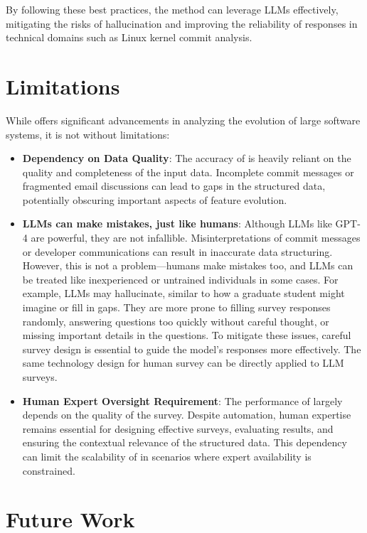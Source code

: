 By following these best practices, the \sys method can leverage LLMs effectively, mitigating the risks of hallucination and improving the reliability of responses in technical domains such as Linux kernel commit analysis.


\section{Limitations}

While \emph{\sys} offers significant advancements in analyzing the evolution of large software systems, it is not without limitations:

\begin{itemize}
    \item \textbf{Dependency on Data Quality}: The accuracy of \emph{\sys} is heavily reliant on the quality and completeness of the input data. Incomplete commit messages or fragmented email discussions can lead to gaps in the structured data, potentially obscuring important aspects of feature evolution.

    \item \textbf{LLMs can make mistakes, just like humans}: Although LLMs like GPT-4 are powerful, they are not infallible. Misinterpretations of commit messages or developer communications can result in inaccurate data structuring. However, this is not a problem—humans make mistakes too, and LLMs can be treated like inexperienced or untrained individuals in some cases. For example, LLMs may hallucinate, similar to how a graduate student might imagine or fill in gaps. They are more prone to filling survey responses randomly, answering questions too quickly without careful thought, or missing important details in the questions. To mitigate these issues, careful survey design is essential to guide the model’s responses more effectively. The same technology design for human survey can be directly applied to LLM surveys.

    \item \textbf{Human Expert Oversight Requirement}: The performance of \sys largely depends on the quality of the survey. Despite automation, human expertise remains essential for designing effective surveys, evaluating results, and ensuring the contextual relevance of the structured data. This dependency can limit the scalability of \emph{\sys} in scenarios where expert availability is constrained.
\end{itemize}

\section{Future Work}

